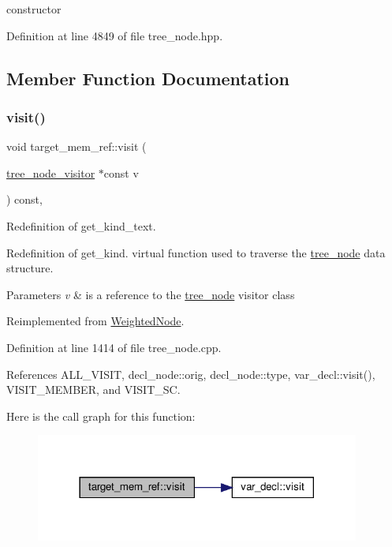 constructor 



Definition at line 4849 of file tree\+\_\+node.\+hpp.



\subsection{Member Function Documentation}
\mbox{\label{structtarget__mem__ref_ab40ad4b7dc4e392c397a4cfcacbc46e1}} 
\subsubsection{\texorpdfstring{visit()}{visit()}}
{\footnotesize\ttfamily void target\+\_\+mem\+\_\+ref\+::visit (\begin{DoxyParamCaption}\item[{\hyperlink{classtree__node__visitor}{tree\+\_\+node\+\_\+visitor} $\ast$const}]{v }\end{DoxyParamCaption}) const\hspace{0.3cm}{\ttfamily [override]}, {\ttfamily [virtual]}}



Redefinition of get\+\_\+kind\+\_\+text. 

Redefinition of get\+\_\+kind. virtual function used to traverse the \hyperlink{classtree__node}{tree\+\_\+node} data structure. 
\begin{DoxyParams}{Parameters}
{\em v} & is a reference to the \hyperlink{classtree__node}{tree\+\_\+node} visitor class \\
\hline
\end{DoxyParams}


Reimplemented from \hyperlink{structWeightedNode_a6f976feccb640a60f96475a668314fde}{Weighted\+Node}.



Definition at line 1414 of file tree\+\_\+node.\+cpp.



References A\+L\+L\+\_\+\+V\+I\+S\+IT, decl\+\_\+node\+::orig, decl\+\_\+node\+::type, var\+\_\+decl\+::visit(), V\+I\+S\+I\+T\+\_\+\+M\+E\+M\+B\+ER, and V\+I\+S\+I\+T\+\_\+\+SC.

Here is the call graph for this function\+:
\nopagebreak
\begin{figure}[H]
\begin{center}
\leavevmode
\includegraphics[width=302pt]{d6/d07/structtarget__mem__ref_ab40ad4b7dc4e392c397a4cfcacbc46e1_cgraph}
\end{center}
\end{figure}


